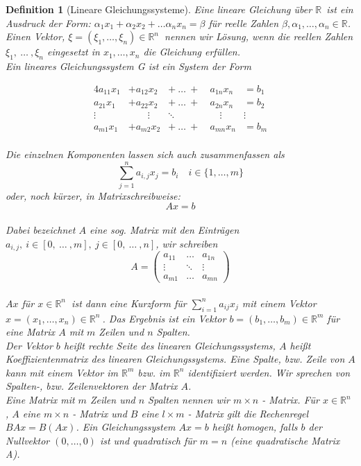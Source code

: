 \documentclass{report}
\newcommand{\IN}[1]{\index{#1|BH}}
\newcommand{\R}{\mathbb{R}}
\newcommand{\mR}{$\mathbb{R}$\ }
\newcommand{\Rn}{\mathbb{R}^n\ }
\theoremstyle{customrem}
\theoremstyle{customdef}
\newtheorem*{definition*}{Definition} %
\begin{document}
	\begin{definition*}[Lineare Gleichungssysteme]
		\IN{Lineare!Gleichungssysteme}
		Eine lineare Gleichung über \mR ist ein Ausdruck der Form: $\alpha_1x_1 + \alpha_2 x_2 + \dots \alpha_n x_n = \beta$ für reelle Zahlen $\beta, \alpha_1, \dots, \alpha_n \in \R$. Einen Vektor, $\xi = \left(\xi_1, \dots, \xi_n\right) \in \Rn$ nennen wir Lösung, wenn die reellen Zahlen  $\xi_1, \ \dots\ , \xi_n$ eingesetzt in $x_1, \dots, x_n$ die Gleichung erfüllen.\\
		Ein lineares Gleichungssystem G ist ein System der Form
		
		\begin{alignat*}{4}
			a_{11} x_1 &+ a_{12}x_2 &+\ \dots\ +\ & a_{1n} x_n &= b_1\\
			a_{21} x_1 &+ a_{22}x_2 &+\ \dots\ +\ & a_{2n} x_n &= b_2\\
			\vdots\quad & \qquad\vdots&\ddots\quad \ \ &\quad\vdots & \vdots\  \\
			a_{m1} x_1 &+ a_{m2} x_2  &+\ \dots\ +\ & a_{mn} x_n &= b_m\\
		\end{alignat*}
		
		Die einzelnen Komponenten lassen sich auch zusammenfassen als $$\sum_{j=1}^n a_{i,j} x_j = b_i \quad i\in\{1,\dots,m\}$$
		oder, noch kürzer, in Matrixschreibweise:
			$$Ax=b$$\\
		Dabei bezeichnet $A$ eine sog. Matrix mit den Einträgen $a_{i,j},\ i\in[0,\ \dots\ , m],\ j\in[0,\ \dots\ , n]$, wir schreiben\\
		$$A =
		\begin{pmatrix}
			a_{11} & \dots  & a_{1n}\\
			\vdots & \ddots & \vdots\\
			a_{m1} & \dots  & a_{mn}
		\end{pmatrix}
		$$\\
		$Ax$ für $x \in \Rn$ ist dann eine Kurzform für $\sum_{i=1}^na_{ij}x_j$ mit einem Vektor $x = (x_1, \dots, x_n) \in \Rn$. Das Ergebnis ist ein Vektor $b = (b_1, \dots, b_m) \in \R^m$ für eine Matrix $A$ mit $m$ Zeilen und $n$ Spalten.\\
		Der Vektor $b$ heißt rechte Seite des linearen Gleichungssystems, $A$ heißt Koeffizientenmatrix des linearen Gleichungssystems. Eine Spalte, bzw. Zeile von $A$ kann mit einem Vektor im $\R^m$ bzw. im $\R^n$ identifiziert werden. Wir sprechen von Spalten-, bzw. Zeilenvektoren der Matrix $A$.\\
		Eine Matrix mit $m$ Zeilen und $n$ Spalten nennen wir $m\times n$ - Matrix. Für $x  \in \Rn $, $A$ eine $m\times n$ - Matrix und $B$ eine $l\times m$ - Matrix gilt die Rechenregel $BAx = B(Ax)$. Ein Gleichungssystem $Ax=b$ heißt homogen, falls $b$ der Nullvektor $(0, \dots, 0)$ ist und quadratisch für  $m = n$ (eine quadratische Matrix A).\\
	\end{definition*}
	
\end{document}
